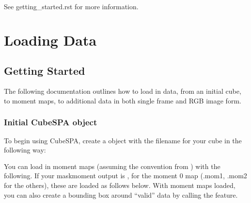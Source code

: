 \documentclass[letterpaper,10pt,english]{sphinxmanual}
\begin{document}
\sphinxAtStartPar
See getting\_started.rst for more information.


\chapter{Loading Data}
\label{\detokenize{index:loading-data}}
\sphinxstepscope


\section{Getting Started}
\label{\detokenize{getting_started:getting-started}}\label{\detokenize{getting_started::doc}}
\sphinxAtStartPar
The following documentation outlines how to load in data, from an initial cube, to moment maps, to additional data
in both single frame and RGB image form.


\subsection{Initial CubeSPA object}
\label{\detokenize{getting_started:initial-cubespa-object}}
\sphinxAtStartPar
To begin using CubeSPA, create a  object with the filename for your cube in the following way:

\begin{sphinxVerbatim}[commandchars=\\\{\}]
 
  
  
\end{sphinxVerbatim}

\sphinxAtStartPar
You can load in moment maps (assuming the convention from   ) with the following. If your maskmoment output is
, for the moment 0 map (.mom1, .mom2 for the others), these are loaded as follows below. With
moment maps loaded, you can also create a bounding box around “valid” data by calling the  feature.

\begin{sphinxVerbatim}[commandchars=\\\{\}]
  
  
    
\end{sphinxVerbatim}
\end{document}
